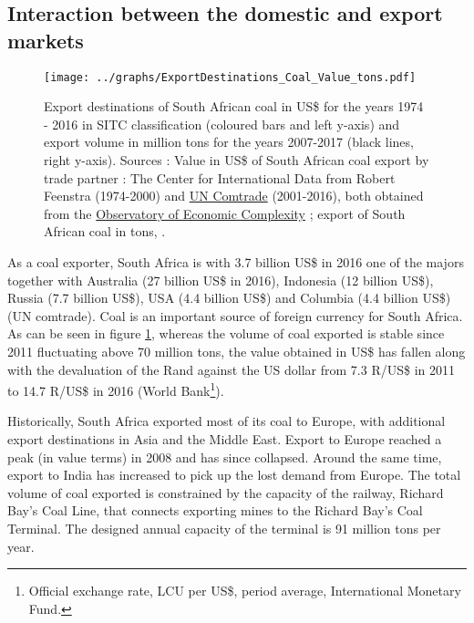 \documentclass[12pt,english]{article}
\begin{document}
\subsection{Interaction between the domestic and export markets}\label{DomesticExport}

\begin{figure}[!t]
	\hspace{-20pt}\texttt{[image: ../graphs/ExportDestinations\_Coal\_Value\_tons.pdf]}
	\caption{\label{ExportDestinations_Coal}\small Export destinations of South African coal in US\$ for the years 1974 - 2016 in SITC classification (coloured bars and left y-axis) and export volume in million tons for the years 2007-2017 (black lines, right y-axis). Sources : Value in US\$ of South African coal export by trade partner : The Center for International Data from Robert Feenstra \citep{feenstra2005world} (1974-2000) and \href{https://comtrade.un.org/}{UN Comtrade} (2001-2016), both obtained from the \href{https://atlas.media.mit.edu/en/visualize/line/sitc/export/zaf/show/3222/1962.2016/}{Observatory of Economic Complexity} ; export of South African coal in tons, .}
\end{figure}

As a coal exporter, South Africa is with 3.7 billion US\$ in 2016 one of the majors together with Australia (27 billion US\$ in 2016), Indonesia (12 billion US\$), Russia (7.7 billion US\$), USA (4.4 billion US\$) and Columbia (4.4 billion US\$) (UN comtrade). Coal is an important source of foreign currency for South Africa. %
As can be seen in figure \ref{ExportDestinations_Coal}, whereas the volume of coal exported is stable since 2011 fluctuating above 70 million tons, the value obtained in US\$ has fallen along with the devaluation of the Rand against the US dollar from 7.3 R/US\$ in 2011 to 14.7 R/US\$ in 2016 (World Bank\footnote{Official exchange rate, LCU per US\$, period average, International Monetary Fund.}). 

Historically, South Africa exported most of its coal to Europe, with additional export destinations in Asia and the Middle East. Export to Europe reached a peak (in value terms) in 2008 and has since collapsed. Around the same time, export to India has increased to pick up the lost demand from Europe. The total volume of coal exported is constrained by the capacity of the railway, Richard Bay's Coal Line, that connects exporting mines to the Richard Bay's Coal Terminal. The designed annual capacity of the terminal is 91 million tons per year.
\end{document}
